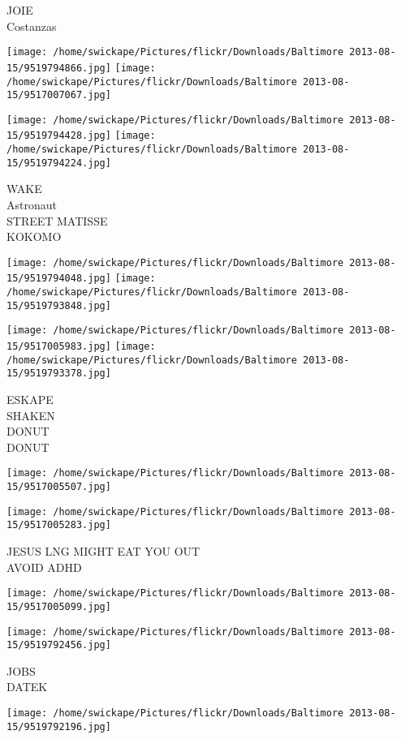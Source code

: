 \documentclass[10pt,letterpaper]{article}
\begin{document}
JOIE\\
Costanzas
\pagebreak

\texttt{[image: /home/swickape/Pictures/flickr/Downloads/Baltimore 2013-08-15/9519794866.jpg]}
\texttt{[image: /home/swickape/Pictures/flickr/Downloads/Baltimore 2013-08-15/9517007067.jpg]}

\texttt{[image: /home/swickape/Pictures/flickr/Downloads/Baltimore 2013-08-15/9519794428.jpg]}
\texttt{[image: /home/swickape/Pictures/flickr/Downloads/Baltimore 2013-08-15/9519794224.jpg]}

WAKE\\
Astronaut\\
STREET MATISSE\\
KOKOMO
\pagebreak

\texttt{[image: /home/swickape/Pictures/flickr/Downloads/Baltimore 2013-08-15/9519794048.jpg]}
\texttt{[image: /home/swickape/Pictures/flickr/Downloads/Baltimore 2013-08-15/9519793848.jpg]}

\texttt{[image: /home/swickape/Pictures/flickr/Downloads/Baltimore 2013-08-15/9517005983.jpg]}
\texttt{[image: /home/swickape/Pictures/flickr/Downloads/Baltimore 2013-08-15/9519793378.jpg]}

ESKAPE\\
SHAKEN\\
DONUT\\
DONUT
\pagebreak

\texttt{[image: /home/swickape/Pictures/flickr/Downloads/Baltimore 2013-08-15/9517005507.jpg]}

\vspace{0.25in}
\texttt{[image: /home/swickape/Pictures/flickr/Downloads/Baltimore 2013-08-15/9517005283.jpg]}

JESUS LNG MIGHT EAT YOU OUT\\
AVOID ADHD
\pagebreak

\texttt{[image: /home/swickape/Pictures/flickr/Downloads/Baltimore 2013-08-15/9517005099.jpg]}

\vspace{0.25in}
\texttt{[image: /home/swickape/Pictures/flickr/Downloads/Baltimore 2013-08-15/9519792456.jpg]}

JOBS\\
DATEK
\pagebreak

\texttt{[image: /home/swickape/Pictures/flickr/Downloads/Baltimore 2013-08-15/9519792196.jpg]}
\end{document}
